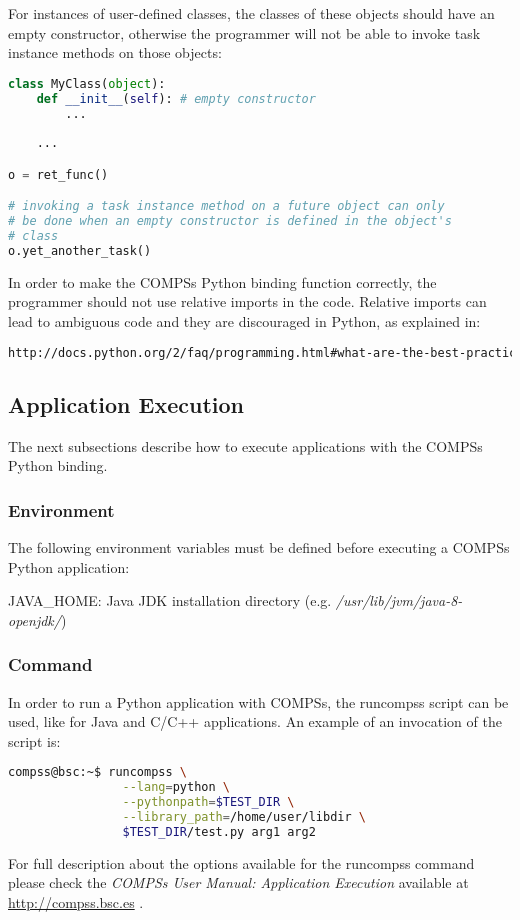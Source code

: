                          
For instances of user-defined classes, the classes of these objects 
should have an empty constructor, otherwise the programmer will not be able to invoke task instance 
methods on those objects:
                                   
\begin{lstlisting}[language=python]
class MyClass(object):
    def __init__(self): # empty constructor
        ...
        
    ...

o = ret_func()

# invoking a task instance method on a future object can only
# be done when an empty constructor is defined in the object's
# class
o.yet_another_task()
\end{lstlisting}

In order to make the COMPSs Python binding function correctly, the programmer should not use relative imports 
in the code. Relative imports can lead to ambiguous code and they are discouraged in Python, as explained in:

\begin{lstlisting}[language=html]
http://docs.python.org/2/faq/programming.html#what-are-the-best-practices-for-using-import-in-a-module
\end{lstlisting}


\subsection{Application Execution}
The next subsections describe how to execute applications with the COMPSs Python binding.

\subsubsection{Environment}
The following environment variables must be defined before executing a COMPSs Python application:

JAVA\_HOME: Java JDK installation directory (e.g. \textit{/usr/lib/jvm/java-8-openjdk/})

\subsubsection{Command}
In order to run a Python application with COMPSs, the runcompss script can be used, like for 
Java and C/C++ applications. An example of an invocation of the script is:

\begin{lstlisting}[language=bash]
compss@bsc:~$ runcompss \
                --lang=python \
                --pythonpath=$TEST_DIR \
                --library_path=/home/user/libdir \
                $TEST_DIR/test.py arg1 arg2
\end{lstlisting}

For full description about the options available for the runcompss command please check the \textit{COMPSs User Manual: Application
Execution} available at \url{http://compss.bsc.es} . 
